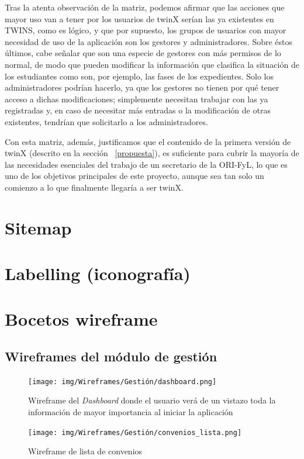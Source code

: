 Tras la atenta observación de la matriz, podemos afirmar que las acciones que mayor uso van a tener por los usuarios de twinX serían las ya existentes en TWINS, como es lógico, y que por supuesto, los grupos de usuarios con mayor necesidad de uso de la aplicación son los gestores y administradores. Sobre éstos últimos, cabe señalar que son una especie de gestores con más permisos de lo normal, de modo que pueden modificar la información que clasifica la situación de los estudiantes como son, por ejemplo, las fases de los expedientes. Solo los administradores podrían hacerlo, ya que los gestores no tienen por qué tener acceso a dichas modificaciones; simplemente necesitan trabajar con las ya registradas y, en caso de necesitar más entradas o la modificación de otras existentes, tendrían que solicitarlo a los administradores.

Con esta matriz, además, justificamos que el contenido de la primera versión de twinX (descrito en la sección ~\ref{propuesta}), es suficiente para cubrir la mayoría de las necesidades esenciales del trabajo de un secretario de la ORI-FyL, lo que es uno de los objetivos principales de este proyecto, aunque sea tan solo un comienzo a lo que finalmente llegaría a ser twinX.

\section{Sitemap}
\section{Labelling (iconografía)}
\section{Bocetos wireframe}

\subsection{Wireframes del módulo de gestión}

\begin{figure}
	\centering
	\texttt{[image: img/Wireframes/Gestión/dashboard.png]}
	\caption[Wireframe de \textit{Dashboard}]{Wireframe del \textit{Dashboard} donde el usuario verá de un vistazo toda la información de mayor importancia al iniciar la aplicación}
	\label{fig:dashboardWF}
\end{figure}

\begin{figure}
	\centering
	\texttt{[image: img/Wireframes/Gestión/convenios\_lista.png]}
	\caption{Wireframe de lista de convenios}
	\label{fig:convenios_listaWF}
\end{figure}

